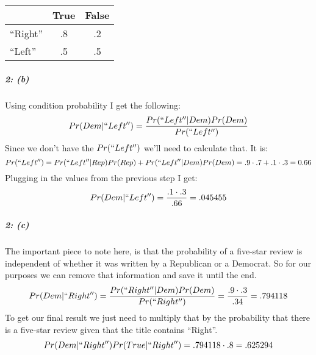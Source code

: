 \documentclass[11pt]{article}
\begin{document}
\begin{center}
\begin{tabular}{|l|c|c|}
  \hline & True & False \\
  \hline ``Right'' & .8 & .2 \\
  \hline ``Left'' & .5 & .5 \\
  \hline
\end{tabular}
\end{center}

\subparagraph{2: (b)} Using condition probability I get the following:
\[Pr(Dem|``Left'') = \frac{Pr(``Left''|Dem)Pr(Dem)}{Pr(``Left'')}\]
Since we don't have the $Pr(``Left'')$ we'll need to calculate that.  It is:
\[Pr(``Left'') = Pr(``Left''|Rep)Pr(Rep) + Pr(``Left''|Dem)Pr(Dem) = .9 \cdot .7 + .1 \cdot .3 = 0.66\]
Plugging in the values from the previous step I get:
\[Pr(Dem|``Left'') = \frac{.1 \cdot .3}{.66} = .045455\]
\subparagraph{2: (c)} The important piece to note here, is that the probability of a five-star review is independent of whether it was written by a Republican or a Democrat.  So for our purposes we can remove that information and save it until the end.
\[Pr(Dem|``Right'') = \frac{Pr(``Right''|Dem)Pr(Dem)}{Pr(``Right'')} = \frac{.9 \cdot .3}{.34} = .794118\]
To get our final result we just need to multiply that by the probability that there is a five-star review given that the title contains ``Right''.
\[Pr(Dem|``Right'')Pr(True|``Right'') = .794118 \cdot .8 = .625294\]
\end{document}
